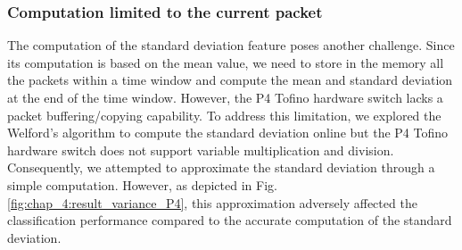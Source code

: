 \subsubsection{Computation limited to the current packet}
The computation of the standard deviation feature poses another challenge. Since its computation is based on the mean value, we need to store in the memory all the packets within a time window and compute the mean and standard deviation at the end of the time window. However, the P4 Tofino hardware switch lacks a packet buffering/copying capability. To address this limitation, we explored the Welford's algorithm to compute the standard deviation online but the P4 Tofino hardware switch does not support variable multiplication and division. Consequently, we attempted to approximate the standard deviation through a simple computation. However, as depicted in Fig. \ref{fig:chap_4:result_variance_P4}, this approximation adversely affected the classification performance compared to the accurate computation of the standard deviation.

